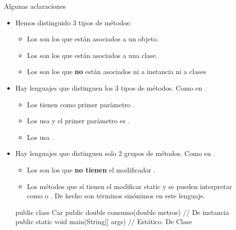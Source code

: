 \documentclass[10pt,envcountsect,spanish]{beamer}
\begin{document}
\begin{frame}[fragile]{Algunas aclaraciones} 

\begin{itemize}
\item Hemos distinguido 3 tipos de métodos:
\begin{itemize}
\item Los  son los que están asociados a un objeto.
\item Los  son los que están asociados a una clase.
\item Los  son los que \textbf{no} están asociados ni a instancia ni a clases
\end{itemize}

\item Hay lenguajes que distinguen los 3 tipos de métodos. Como en .
\begin{itemize}
\item Los  tienen como primer parámetro .
\item Los  usa  y el primer parámetro es  . 
\item Los  usa  .
\end{itemize}

\item Hay lenguajes que distinguen solo 2 grupos de métodos. Como en .
\begin{itemize}
\item Los  son los que \textbf{no tienen} el modificador .
\item Los métodos que sí tienen el modificar static y se pueden interpretar como  o . De hecho son términos sinónimos en este lenguaje.
\end{itemize}

\footnotesize
\begin{code}
public class Car {
  public double consumo(double metros) { }  // De instancia
  public static void main(String[] args) { }// Estático. De Clase
}
\end{code}

\end{itemize}

\end{frame}
\end{document}
